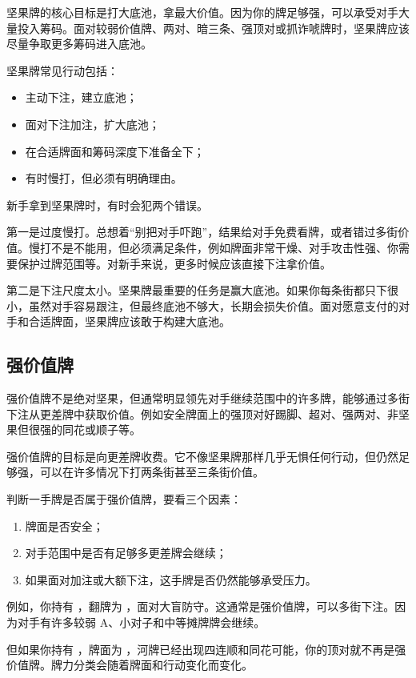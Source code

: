 坚果牌的核心目标是打大底池，拿最大价值。因为你的牌足够强，可以承受对手大量投入筹码。面对较弱价值牌、两对、暗三条、强顶对或抓诈唬牌时，坚果牌应该尽量争取更多筹码进入底池。

坚果牌常见行动包括：

\begin{itemize}
\item 主动下注，建立底池；
\item 面对下注加注，扩大底池；
\item 在合适牌面和筹码深度下准备全下；
\item 有时慢打，但必须有明确理由。
\end{itemize}

新手拿到坚果牌时，有时会犯两个错误。

第一是过度慢打。总想着“别把对手吓跑”，结果给对手免费看牌，或者错过多街价值。慢打不是不能用，但必须满足条件，例如牌面非常干燥、对手攻击性强、你需要保护过牌范围等。对新手来说，更多时候应该直接下注拿价值。

第二是下注尺度太小。坚果牌最重要的任务是赢大底池。如果你每条街都只下很小，虽然对手容易跟注，但最终底池不够大，长期会损失价值。面对愿意支付的对手和合适牌面，坚果牌应该敢于构建大底池。

\subsection{强价值牌}

强价值牌不是绝对坚果，但通常明显领先对手继续范围中的许多牌，能够通过多街下注从更差牌中获取价值。例如安全牌面上的强顶对好踢脚、超对、强两对、非坚果但很强的同花或顺子等。

强价值牌的目标是向更差牌收费。它不像坚果牌那样几乎无惧任何行动，但仍然足够强，可以在许多情况下打两条街甚至三条街价值。

判断一手牌是否属于强价值牌，要看三个因素：

\begin{enumerate}
\item 牌面是否安全；
\item 对手范围中是否有足够多更差牌会继续；
\item 如果面对加注或大额下注，这手牌是否仍然能够承受压力。
\end{enumerate}

例如，你持有 ，翻牌为 ，面对大盲防守。这通常是强价值牌，可以多街下注。因为对手有许多较弱 A、小对子和中等摊牌牌会继续。

但如果你持有 ，牌面为 ，河牌已经出现四连顺和同花可能，你的顶对就不再是强价值牌。牌力分类会随着牌面和行动变化而变化。

